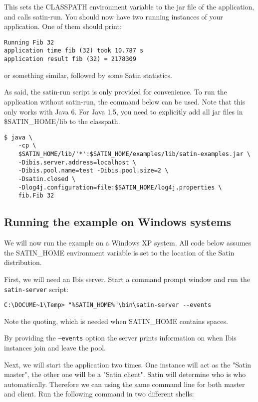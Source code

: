 \documentclass[a4paper,10pt]{article}
\begin{document}
This sets the CLASSPATH environment variable to the jar file of the
application, and calls satin-run. You should now have two running
instances of your application. One of them should print:

\noindent
{\small
\begin{verbatim}
Running Fib 32
application time fib (32) took 10.787 s
application result fib (32) = 2178309
\end{verbatim}
}
\noindent

or something similar, followed by some Satin statistics.

As said, the satin-run script is only provided for convenience. To run
the application without satin-run, the command below can be used.
Note that this only works with Java 6. For Java 1.5, you need to
explicitly add all jar files in \$SATIN\_HOME/lib to the classpath.

\noindent
{\small
\begin{verbatim}
$ java \
    -cp \
    $SATIN_HOME/lib/'*':$SATIN_HOME/examples/lib/satin-examples.jar \
    -Dibis.server.address=localhost \
    -Dibis.pool.name=test -Dibis.pool.size=2 \
    -Dsatin.closed \
    -Dlog4j.configuration=file:$SATIN_HOME/log4j.properties \
    fib.Fib 32
\end{verbatim}
}
\noindent

\subsection{Running the example on Windows systems}

We will now run the example on a Windows XP system.
All code below assumes the SATIN\_HOME
environment variable is set to the location of the Satin distribution.

First, we will need an Ibis server. Start a command prompt window and
run the \texttt{satin-server} script:
\noindent
{\small
\begin{verbatim}
C:\DOCUME~1\Temp> "%SATIN_HOME%"\bin\satin-server --events
\end{verbatim}
}
\noindent

Note the quoting, which is needed when SATIN\_HOME contains spaces.

By providing the \texttt{--events} option the server
prints information on when Ibis instances join and leave the pool.

Next, we will start the application two times. One instance will act as the
"Satin master", the other one will be a "Satin client".
Satin will determine who is who automatically. Therefore we can using the same
command line for both master and client.
Run the following command in two different shells:
\end{document}
